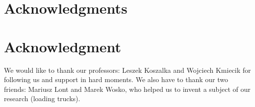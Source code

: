 \documentclass[conference,compsoc]{IEEEtran}
\begin{document}
\ifCLASSOPTIONcompsoc
  \section*{Acknowledgments}
\else
  \section*{Acknowledgment}
\fi

We would like to thank our professors: Leszek Koszalka and Wojciech Kmiecik for following us and support in hard moments. We also have to thank our two friends: Mariusz Lont and Marek Wosko, who helped us to invent a subject of our research (loading trucks). 





\end{document}
